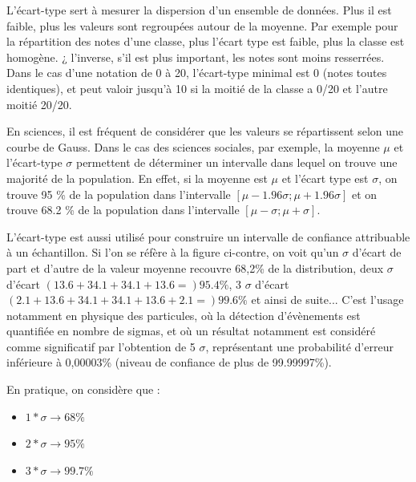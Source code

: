 L'écart-type sert à mesurer la dispersion d'un ensemble de données. Plus il est faible, plus les valeurs sont regroupées autour de la moyenne. Par exemple pour la répartition des notes d'une classe, plus l'écart type est faible, plus la classe est homogène. ¿ l'inverse, s'il est plus important, les notes sont moins resserrées. Dans le cas d'une notation de 0 à 20, l'écart-type minimal est 0 (notes toutes identiques), et peut valoir jusqu'à 10 si la moitié de la classe a 0/20 et l'autre moitié 20/20.

En sciences, il est fréquent de considérer que les valeurs se répartissent selon une courbe de Gauss. Dans le cas des sciences sociales, par exemple, la moyenne $\mu$ et l'écart-type $\sigma$ permettent de déterminer un intervalle dans lequel on trouve une majorité de la population. En effet, si la moyenne est $\mu$ et l'écart type est $\sigma$, on trouve 95 \% de la population dans l'intervalle $[ \mu - 1.96 \sigma ; \mu + 1.96 \sigma ]$ et on trouve 68.2 \% de la population dans l'intervalle $[ \mu - \sigma ; \mu + \sigma ]$.

L'écart-type est aussi utilisé pour construire un intervalle de confiance attribuable à un échantillon. Si l'on se réfère à la figure ci-contre, on voit qu'un $\sigma$ d'écart de part et d'autre de la valeur moyenne recouvre 68,2\% de la distribution, deux $\sigma$ d'écart $(13.6+34.1+34.1+13.6 =) 95.4\%$, 3 $\sigma$ d'écart $(2.1+13.6+34.1+34.1+13.6+2.1 =) 99.6\%$ et ainsi de suite... C'est l'usage notamment en physique des particules, où la détection d'évènements est quantifiée en nombre de sigmas, et où un résultat notamment est considéré comme significatif par l'obtention de 5 $\sigma$, représentant une probabilité d'erreur inférieure à 0,00003\% (niveau de confiance de plus de 99.99997\%).

En pratique, on considère que :
\begin{itemize}\itemsep1pt
\renewcommand{\labelitemi}{$\bullet$}

\item $1 * \sigma \rightarrow 68\% $
\item $2 * \sigma \rightarrow 95\% $
\item $3 * \sigma \rightarrow 99.7\%$

\end{itemize}


